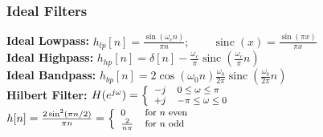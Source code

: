 \documentclass{article}
\begin{document}
\begin{multicols}{2}
\subsubsection{Ideal Filters}
\textbf{Ideal Lowpass:} $h_{lp}[n] = \frac{\sin(\omega_cn)}{\pi n}; \qquad \operatorname{sinc}(x) = \frac{\sin (\pi x)}{\pi x}$\\
\textbf{Ideal Highpass:} $h_{hp}[n] = \delta[n] - \frac{\omega_c}{\pi}\operatorname{sinc}\left ( \frac{\omega_c}{\pi} n \right) $\\
\textbf{Ideal Bandpass:} $h_{bp}[n] =2\cos(\omega_0 n)\frac{\omega_b}{2\pi}\operatorname{sinc}\left ( \frac{\omega_b}{2\pi} n \right) $\\
\textbf{Hilbert Filter:} $ H(e^{j\omega} )=\footnotesize \left \{ \begin{array}{ll} -j & 0\leq \omega \leq \pi \\ +j &-\pi \leq \omega \leq 0 \end{array}  \right.$\\
$ h[n] = \frac{2\sin^2(\pi n/2)}{\pi n} =\footnotesize \left \{ \begin{array}{ll} 0& \text{for } n \text{ even} \\ \frac2{n\pi} &\text{for } n \text{ odd} \end{array}  \right.$
% 
\end{multicols}
\end{document}
